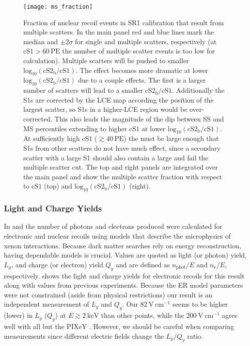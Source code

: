 \begin{figure}
\centering
\texttt{[image: ms\_fraction]}
\caption{Fraction of nuclear recoil events in SR1 \ambe calibration that result from multiple scatters.  In the main panel red and
blue lines mark the median and $\pm 2\sigma$ for single and multiple scatters, respectively (at $\mathrm{cS1} > 60\ \mathrm{PE}$ the
number of multiple scatter events is too low for calculation).  Multiple scatters will be pushed to smaller
$\mathrm{log}_{10}(\mathrm{cS2_b / cS1})$.  The effect becomes more dramatic at lower
$\mathrm{log}_{10}(\mathrm{cS2_b / cS1})$ due to a couple effects.  The first is a larger number of scatters will lead to a
smaller $\mathrm{cS2_b / cS1}$.  Additionally the S1s are corrected by the LCE map
according the position of the largest scatter, so S1s in a higher-LCE region
would be over-corrected.  This also leads the magnitude of the dip between SS and MS percentiles extending to higher $\mathrm{cS1}$
at lower $\mathrm{log}_{10}(\mathrm{cS2_b / cS1})$.  At sufficiently high $\mathrm{cS1}$ ($\gtrsim 40\ \mathrm{PE}$) the
\cstwob must be large enough that S1s from other scatters do not have much effect, since a secondary scatter with a large S1 should also
contain a large \stwob and fail the multiple scatter cut.  The top and right panels are integrated over the main panel and show the
multiple scatter fraction with respect to $\mathrm{cS1}$ (top) and $\mathrm{log}_{10}(\mathrm{cS2_b / cS1})$ (right).}
\label{fig:er_nr_calibrations_results_ms_fraction}
\end{figure}



\subsubsection{Light and Charge Yields}
\label{subsubsec:er_nr_calibrations_results_ly_qy}
In  and  the number
of photons and electrons produced were calculated for electronic and nuclear recoils using models that describe
the microphysics of xenon interactions.  Because dark matter searches rely on energy reconstruction, having dependable models is
crucial.  Values are quoted as light (or photon) yield, $L_y$, and charge (or electron) yield $Q_y$ and are defined as
$n_{\mathrm{phot}}/E$ and $n_{\mathrm{e}} / E$, respectively.   shows the light and
charge yields for electronic recoils for this result along with values from previous experiments.  Because the ER model parameters were
not constrained (aside from physical restrictions) our result is an independent measurement of $L_y$ and $Q_y$.  Our
$82\ \mathrm{V\ cm^{-1}}$ seems to be higher (lower) in $L_y$ ($Q_y$) at $E \gtrsim 2\ \mathrm{keV}$ than
other points, while the $200\ \mathrm{V\ cm^{-1}}$ agree well with all but the PIXeY .  However, we should be careful when
comparing measurements since different electric fields change the $L_y/Q_y$ ratio.

